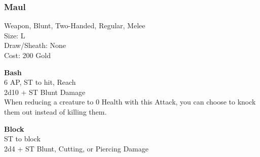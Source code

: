 \subsubsection{Maul}\label{weapon:maul}
Weapon, Blunt, Two-Handed, Regular, Melee\\
Size: L\\
Draw/Sheath: None\\
Cost: 200 Gold

\textbf{Bash}\\
6 AP, ST to hit,  Reach\\
2d10 + ST Blunt Damage\\
When reducing a creature to 0 Health with this Attack, you can choose to knock them out instead of killing them.

\textbf{Block}\\
ST to block\\
2d4 + \texttimes ST Blunt, Cutting, or Piercing Damage
